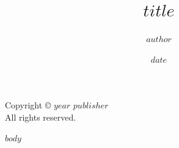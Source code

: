 \documentclass[$if(fontsize)$$fontsize$,$endif$$if(papersize)$$papersize$,$endif$]{$documentclass$}
\title{$title$}
\author{$author$}
\date{$date$}
\begin{document}
\maketitle
\thispagestyle{empty}

\newpage
\thispagestyle{empty}
\vspace*{\fill}
\begin{center}
Copyright © $year$ $publisher$\\
All rights reserved.
\end{center}
\vspace*{\fill}

\tableofcontents

$body$
\end{document}
